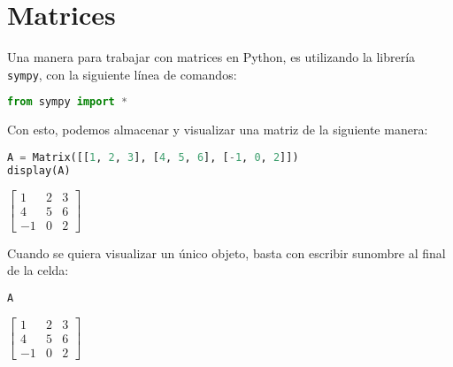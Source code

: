 \documentclass[a4,11pt]{aleph-notas}
\begin{document}
\encabezado

\vspace*{-10mm}
\section{Matrices}


Una manera para trabajar con matrices en Python, es utilizando la librería \texttt{sympy}, con la siguiente línea de comandos:

\begin{pycodigo}
    \begin{ipynbcodigo}\begin{lstlisting}[language=Python]
from sympy import *
    \end{lstlisting}\end{ipynbcodigo}
\end{pycodigo}

Con esto, podemos almacenar y visualizar una matriz de la siguiente manera:
\begin{pycodigo}
    \begin{ipynbcodigo}\begin{lstlisting}[language=Python]
A = Matrix([[1, 2, 3], [4, 5, 6], [-1, 0, 2]])
display(A)
    \end{lstlisting}\end{ipynbcodigo}
    \begin{ipynbsalida}[2mm]
        $\displaystyle \left[\begin{matrix}1 & 2 & 3\\4 & 5 & 6\\-1 & 0 & 2\end{matrix}\right]$
    \end{ipynbsalida}
\end{pycodigo}

    
Cuando se quiera visualizar un único objeto, basta con escribir sunombre al final de la celda:
\begin{pycodigo}
    \begin{ipynbcodigo}\begin{lstlisting}[language=Python]
A
    \end{lstlisting}\end{ipynbcodigo}
    \begin{ipynbsalida}[2mm]
        $\displaystyle \left[\begin{matrix}1 & 2 & 3\\4 & 5 & 6\\-1 & 0 & 2\end{matrix}\right]$
    \end{ipynbsalida}
\end{pycodigo}
    
\end{document}
